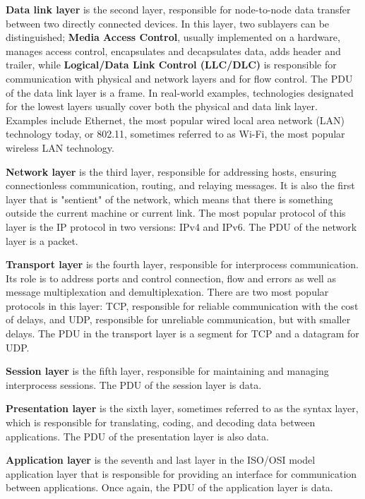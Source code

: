 \textbf{Data link layer} is the second layer, responsible for node-to-node data transfer between two directly connected devices. In this layer, two sublayers can be distinguished; \textbf{Media Access Control}, usually implemented on a hardware, manages access control, encapsulates and decapsulates data, adds header and trailer, while \textbf{Logical/Data Link Control (LLC/DLC)} is responsible for communication with physical and network layers and for flow control. The PDU of the data link layer is a frame.
In real-world examples, technologies designated for the lowest layers usually cover both the physical and data link layer. Examples include Ethernet, the most popular wired local area network (LAN) technology today, or 802.11, sometimes referred to as Wi-Fi, the most popular wireless LAN technology.

\textbf{Network layer} is the third layer, responsible for addressing hosts, ensuring connectionless communication, routing, and relaying messages. It is also the first layer that is "sentient" of the network, which means that there is something outside the current machine or current link. The most popular protocol of this layer is the IP protocol in two versions: IPv4 and IPv6. The PDU of the network layer is a packet.

\textbf{Transport layer} is the fourth layer, responsible for interprocess communication. Its role is to address ports and control connection, flow and errors as well as message multiplexation and demultiplexation. There are two most popular protocols in this layer: TCP, responsible for reliable communication with the cost of delays, and UDP, responsible for unreliable communication, but with smaller delays. The PDU in the transport layer is a segment for TCP and a datagram for UDP.

\textbf{Session layer} is the fifth layer, responsible for maintaining and managing interprocess sessions. The PDU of the session layer is data. 

\textbf{Presentation layer} is the sixth layer, sometimes referred to as the syntax layer, which is responsible for translating, coding, and decoding data between applications. The PDU of the presentation layer is also data.

\textbf{Application layer} is the seventh and last layer in the ISO/OSI model application layer that is responsible for providing an interface for communication between applications. Once again, the PDU of the application layer is data.



